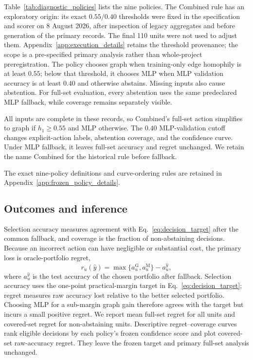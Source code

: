 Table~\ref{tab:diagnostic_policies} lists the nine policies. The Combined rule has an exploratory origin: its exact $0.55/0.40$ thresholds were fixed in the specification and scorer on 8 August 2026, after inspection of legacy aggregates and before generation of the primary records. The final 110 units were not used to adjust them. Appendix~\ref{app:execution_details} retains the threshold provenance; the scope is a pre-specified primary analysis rather than whole-project preregistration. The policy chooses graph when training-only edge homophily is at least $0.55$; below that threshold, it chooses MLP when MLP validation accuracy is at least $0.40$ and otherwise abstains. Missing inputs also cause abstention. For full-set evaluation, every abstention uses the same predeclared MLP fallback, while coverage remains separately visible.

All inputs are complete in these records, so Combined's full-set action simplifies to graph if $h_1\geq0.55$ and MLP otherwise. The $0.40$ MLP-validation cutoff changes explicit-action labels, abstention coverage, and the confidence curve. Under MLP fallback, it leaves full-set accuracy and regret unchanged. We retain the name Combined for the historical rule before fallback.

The exact nine-policy definitions and curve-ordering rules are retained in Appendix~\ref{app:frozen_policy_details}.

\subsection{Outcomes and inference}

Selection accuracy measures agreement with Eq.~\eqref{eq:decision_target} after the common fallback, and coverage is the fraction of non-abstaining decisions. Because an incorrect action can have negligible or substantial cost, the primary loss is oracle-portfolio regret,
\begin{equation}
r_u(\widehat{y})=\max\{a_u^{\mathrm{G}},a_u^{\mathrm{M}}\}-a_u^{\widehat{y}},
\label{eq:oracle_regret}
\end{equation}
where $a_u^{\widehat{y}}$ is the test accuracy of the chosen portfolio after fallback. Selection accuracy uses the one-point practical-margin target in Eq.~\eqref{eq:decision_target}; regret measures raw accuracy lost relative to the better selected portfolio. Choosing MLP for a sub-margin graph gain therefore agrees with the target but incurs a small positive regret. We report mean full-set regret for all units and covered-set regret for non-abstaining units. Descriptive regret--coverage curves rank eligible decisions by each policy's frozen confidence score and plot covered-set raw-accuracy regret. They leave the frozen target and primary full-set analysis unchanged.

